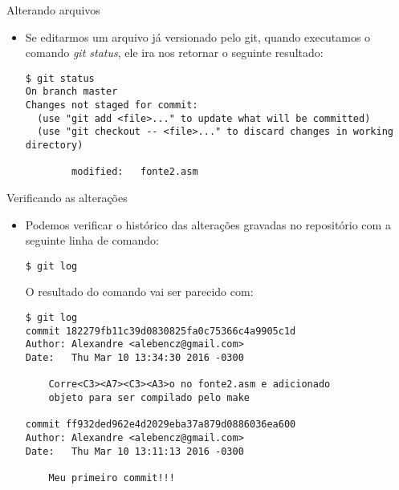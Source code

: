 \begin{slide}[method=direct]{Alterando arquivos}
	\begin{itemize}
	\item{Se editarmos um arquivo já versionado pelo git, quando executamos o comando \textit{git status}, ele ira nos retornar o seguinte resultado:}
	\begin{lstlisting}[basicstyle=\tiny]
$ git status
On branch master
Changes not staged for commit:
  (use "git add <file>..." to update what will be committed)
  (use "git checkout -- <file>..." to discard changes in working directory)

        modified:   fonte2.asm
	\end{lstlisting}
	\end{itemize}
\end{slide}

\begin{slide}[method=direct]{Verificando as alterações}
	\begin{itemize}
	\item{Podemos verificar o histórico das alterações gravadas no repositório com a seguinte linha de comando:
	\begin{lstlisting}[style=Bash]
$ git log
	\end{lstlisting}
	O resultado do comando vai ser parecido com:
	\begin{lstlisting}[basicstyle=\tiny]
$ git log
commit 182279fb11c39d0830825fa0c75366c4a9905c1d
Author: Alexandre <alebencz@gmail.com>
Date:   Thu Mar 10 13:34:30 2016 -0300

    Corre<C3><A7><C3><A3>o no fonte2.asm e adicionado
    objeto para ser compilado pelo make

commit ff932ded962e4d2029eba37a879d0886036ea600
Author: Alexandre <alebencz@gmail.com>
Date:   Thu Mar 10 13:11:13 2016 -0300

    Meu primeiro commit!!!
          \end{lstlisting}
	}
	\end{itemize}
\end{slide}